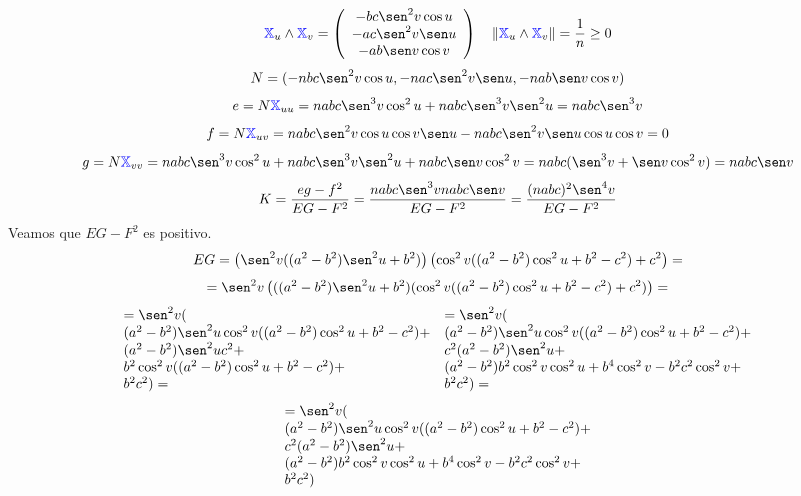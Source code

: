 \documentclass{article}
\newcommand{\bb}[1]{\mathbb{#1}}
\begin{document}
$$
\textcolor{blue}{\bb{X}}_u \land \textcolor{blue}{\bb{X}}_v =
\left(\begin{array}{c}
-bc \sen^2 v \cos u \\
-ac \sen^2 v \sen u \\
-ab \sen v \cos v
\end{array}\right) \quad
\| \textcolor{blue}{\bb{X}}_u \land \textcolor{blue}{\bb{X}}_v \| = \frac{1}{n} \ge 0
$$
$$
N = (-nbc \sen^2 v \cos u, -nac \sen^2 v \sen u, -nab \sen v \cos v)
$$
$$
e = N \textcolor{blue}{\bb{X}}_{uu} =
nabc \sen^3 v \cos^2 u + nabc \sen^3 v \sen^2 u =
nabc \sen^3 v
$$
$$
f = N \textcolor{blue}{\bb{X}}_{uv} =
nabc \sen^2 v \cos u \cos v \sen u - nabc \sen^2 v \sen u \cos u \cos v =
0
$$
$$
g = N \textcolor{blue}{\bb{X}}_{vv} =
nabc \sen^3 v \cos^2 u + nabc \sen^3 v \sen^2 u + nabc \sen v \cos^2 v =
nabc (\sen^3 v + \sen v \cos^2 v) = 
nabc \sen v
$$
$$
K = \frac{eg-f^2}{EG-F^2} = \frac{nabc \sen^3 v nabc \sen v}{EG-F^2} = \frac{(nabc)^2 \sen^4 v}{EG-F^2}
$$
Veamos que $EG - F^2$ es positivo.
$$
EG = \left(\sen^2 v ((a^2-b^2)\sen^2 u + b^2)\right) \left(\cos^2 v ((a^2-b^2) \cos^2 u + b^2 - c^2) + c^2\right) =
$$
$$
= \sen^2 v \left(
  ((a^2-b^2)\sen^2 u + b^2) (\cos^2 v ((a^2-b^2) \cos^2 u + b^2 - c^2) + c^2)
\right) =
$$
$$
\begin{array}{l}
  = \sen^2 v ( \\
  (a^2-b^2)\sen^2 u \cos^2 v ((a^2-b^2) \cos^2 u + b^2 - c^2) + \\
  (a^2-b^2)\sen^2 u c^2 + \\
  b^2 \cos^2 v ((a^2-b^2) \cos^2 u + b^2 - c^2) + \\
  b^2 c^2 ) =
\end{array}
\begin{array}{l}
  = \sen^2 v ( \\
  (a^2-b^2)\sen^2 u \cos^2 v ((a^2-b^2) \cos^2 u + b^2 - c^2) + \\
  c^2(a^2-b^2)\sen^2 u + \\
  (a^2-b^2) b^2 \cos^2 v \cos^2 u + b^4 \cos^2 v - b^2c^2 \cos^2 v + \\
  b^2 c^2 ) =
\end{array}
$$
$$
\begin{array}{l}
  = \sen^2 v ( \\
  (a^2-b^2)\sen^2 u \cos^2 v ((a^2-b^2) \cos^2 u + b^2 - c^2) + \\
  c^2(a^2-b^2)\sen^2 u + \\
  (a^2-b^2) b^2 \cos^2 v \cos^2 u + b^4 \cos^2 v - b^2c^2 \cos^2 v + \\
  b^2 c^2 )
\end{array}
$$
\end{document}
